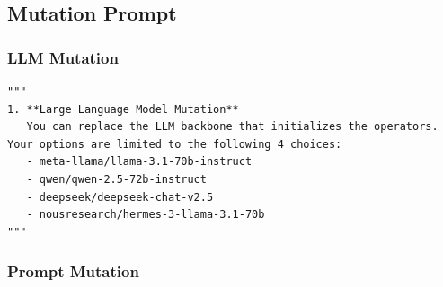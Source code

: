 \documentclass{article}
\theoremstyle{plain}
\theoremstyle{definition}
\theoremstyle{remark}
\begin{document}
\subsection{Mutation Prompt}\label{app:prompt_muta}


\subsubsection{LLM Mutation}\label{app:change_llm}

\begin{tcolorbox}[notitle, sharp corners, breakable, colframe=YellowGreen, colback=white, 
       boxrule=3pt, boxsep=0.5pt, enhanced, 
       shadow={3pt}{-3pt}{0pt}{opacity=1,mygrey},
       title={LLM Mutation},]
       \footnotesize
       {\selectfont
\begin{lstlisting}
"""
1. **Large Language Model Mutation**  
   You can replace the LLM backbone that initializes the operators. Your options are limited to the following 4 choices:
   - meta-llama/llama-3.1-70b-instruct
   - qwen/qwen-2.5-72b-instruct
   - deepseek/deepseek-chat-v2.5
   - nousresearch/hermes-3-llama-3.1-70b
"""
\end{lstlisting}
}
\end{tcolorbox}


\subsubsection{Prompt Mutation}\label{app:change_prompt}
\end{document}
